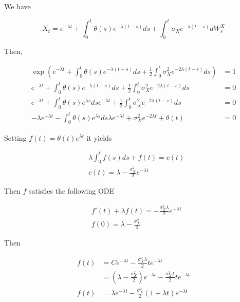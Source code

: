 \documentclass{article}
\begin{document}
\noindent We have 

\begin{equation}
	X_t = e^{-\lambda t} + \int_{0}^t \theta(s) e^{-\lambda (t-s)} ds + \int_0^t \sigma_X e^{-\lambda(t-s)} dW_s^X
\end{equation}

\noindent Then,

\begin{equation*}
\begin{aligned}
	\exp\left(e^{-\lambda t} + \int_{0}^t \theta(s) e^{-\lambda (t-s)} ds + \frac{1}{2}\int_0^t \sigma_X^2 e^{-2\lambda(t-s)} ds\right) &= 1\\
	e^{-\lambda t} + \int_{0}^t \theta(s) e^{-\lambda (t-s)} ds + \frac{1}{2}\int_0^t \sigma_X^2 e^{-2\lambda(t-s)} ds &= 0\\
	e^{-\lambda t} + \int_{0}^t \theta(s) e^{\lambda s} ds e^{-\lambda t} + \frac{1}{2}\int_0^t \sigma_X^2 e^{-2\lambda(t-s)} ds &= 0\\
	-\lambda e^{-\lambda t} - \int_{0}^t \theta(s) e^{\lambda s} ds \lambda e^{-\lambda t} + \sigma_X^2 e^{-2\lambda t} + \theta(t) &= 0
\end{aligned}
\end{equation*}

Setting $f(t) = \theta(t) e^{\lambda t}$ it yields

\begin{equation}
\begin{aligned}
	&\lambda \int_0^t f(s) ds + f(t) = c(t)\\
	&c(t) = \lambda - \frac{\sigma_X^2}{2} e^{-\lambda t}
\end{aligned}
\end{equation}

\noindent Then $f$ satisfies the following ODE

\begin{equation}
\begin{aligned}
	& f'(t) + \lambda f(t) = -\frac{\sigma_X^2 \lambda}{2} e^{-\lambda t}\\
	&f(0) = \lambda - \frac{\sigma_X^2}{2}
\end{aligned}
\end{equation}

\noindent Then

\begin{equation}
\begin{aligned}
	f(t) &= Ce^{-\lambda t} - \frac{\sigma_X^2 \lambda}{2}t e^{-\lambda t}\\
	&= \left(\lambda - \frac{\sigma_X^2}{2}\right) e^{-\lambda t} - \frac{\sigma_X^2 \lambda}{2}t e^{-\lambda t}\\
	f(t) &= \lambda e^{-\lambda t} - \frac{\sigma_X^2}{2} (1 + \lambda t) e^{-\lambda t}
\end{aligned}
\end{equation}
\end{document}
